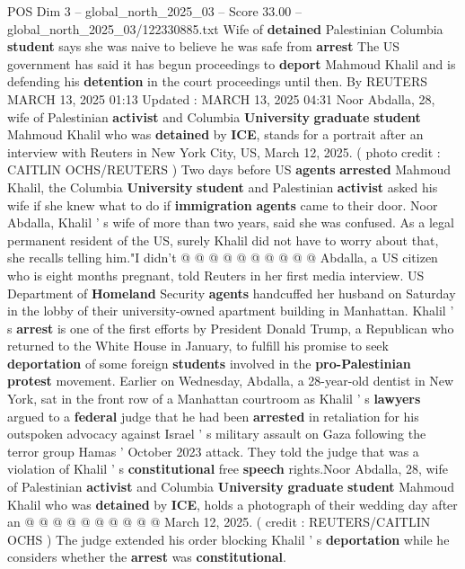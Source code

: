 \begin{textsample}{POS Dim 3 – global\_north\_2025\_03 – Score 33.00 – global\_north\_2025\_03/122330885.txt}  \label{ex:f3_pos_027}
Wife of \textbf{detained} Palestinian Columbia \textbf{student} says she was naive to believe he was safe from \textbf{arrest} The US government has said it has begun proceedings to \textbf{deport} Mahmoud Khalil and is defending his \textbf{detention} in the court proceedings until then.
By REUTERS MARCH 13, 2025 01:13 Updated : MARCH 13, 2025 04:31 Noor Abdalla, 28, wife of Palestinian \textbf{activist} and Columbia \textbf{University} \textbf{graduate} \textbf{student} Mahmoud Khalil who was \textbf{detained} by \textbf{ICE}, stands for a portrait after an interview with Reuters in New York City, US, March 12, 2025. ( photo credit : CAITLIN OCHS/REUTERS ) Two days before US \textbf{agents} \textbf{arrested} Mahmoud Khalil, the Columbia \textbf{University} \textbf{student} and Palestinian \textbf{activist} asked his wife if she knew what to do if \textbf{immigration} \textbf{agents} came to their door.
Noor Abdalla, Khalil ' s wife of more than two years, said she was confused.
As a legal permanent resident of the US, surely Khalil did not have to worry about that, she recalls telling him."I didn't @ @ @ @ @ @ @ @ @ @ Abdalla, a US citizen who is eight months pregnant, told Reuters in her first media interview.
US Department of \textbf{Homeland} Security \textbf{agents} handcuffed her husband on Saturday in the lobby of their university-owned apartment building in Manhattan.
Khalil ' s \textbf{arrest} is one of the first efforts by President Donald Trump, a Republican who returned to the White House in January, to fulfill his promise to seek \textbf{deportation} of some foreign \textbf{students} involved in the \textbf{pro-Palestinian} \textbf{protest} movement.
Earlier on Wednesday, Abdalla, a 28-year-old dentist in New York, sat in the front row of a Manhattan courtroom as Khalil ' s \textbf{lawyers} argued to a \textbf{federal} judge that he had been \textbf{arrested} in retaliation for his outspoken advocacy against Israel ' s military assault on Gaza following the terror group Hamas ' October 2023 attack.
They told the judge that was a violation of Khalil ' s \textbf{constitutional} free \textbf{speech} rights.Noor Abdalla, 28, wife of Palestinian \textbf{activist} and Columbia \textbf{University} \textbf{graduate} \textbf{student} Mahmoud Khalil who was \textbf{detained} by \textbf{ICE}, holds a photograph of their wedding day after an @ @ @ @ @ @ @ @ @ @ March 12, 2025. ( credit : REUTERS/CAITLIN OCHS ) The judge extended his order blocking Khalil ' s \textbf{deportation} while he considers whether the \textbf{arrest} was \textbf{constitutional}.

\end{textsample}
